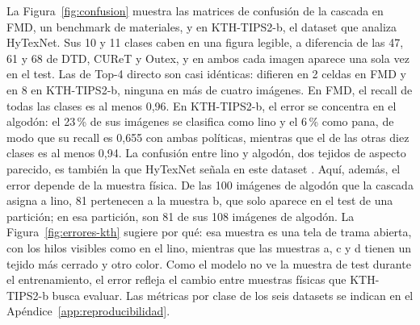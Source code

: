 \documentclass[a4paper,fleqn]{cas-sc}
\begin{document}
La Figura~\ref{fig:confusion} muestra las matrices de confusión de la cascada en FMD, un benchmark de materiales, y en KTH-TIPS2-b, el dataset que analiza HyTexNet. Sus 10 y 11 clases caben en una figura legible, a diferencia de las 47, 61 y 68 de DTD, CUReT y Outex, y en ambos cada imagen aparece una sola vez en el test. Las de Top-4 directo son casi idénticas: difieren en 2 celdas en FMD y en 8 en KTH-TIPS2-b, ninguna en más de cuatro imágenes. En FMD, el recall de todas las clases es al menos 0,96. En KTH-TIPS2-b, el error se concentra en el algodón: el 23\,\% de sus imágenes se clasifica como lino y el 6\,\% como pana, de modo que su recall es 0,655 con ambas políticas, mientras que el de las otras diez clases es al menos 0,94. La confusión entre lino y algodón, dos tejidos de aspecto parecido, es también la que HyTexNet señala en este dataset \citep{gupta2026hytexnet}. Aquí, además, el error depende de la muestra física. De las 100 imágenes de algodón que la cascada asigna a lino, 81 pertenecen a la muestra b, que solo aparece en el test de una partición; en esa partición, son 81 de sus 108 imágenes de algodón. La Figura~\ref{fig:errores-kth} sugiere por qué: esa muestra es una tela de trama abierta, con los hilos visibles como en el lino, mientras que las muestras a, c y d tienen un tejido más cerrado y otro color. Como el modelo no ve la muestra de test durante el entrenamiento, el error refleja el cambio entre muestras físicas que KTH-TIPS2-b busca evaluar. Las métricas por clase de los seis datasets se indican en el Apéndice~\ref{app:reproducibilidad}.
\end{document}
